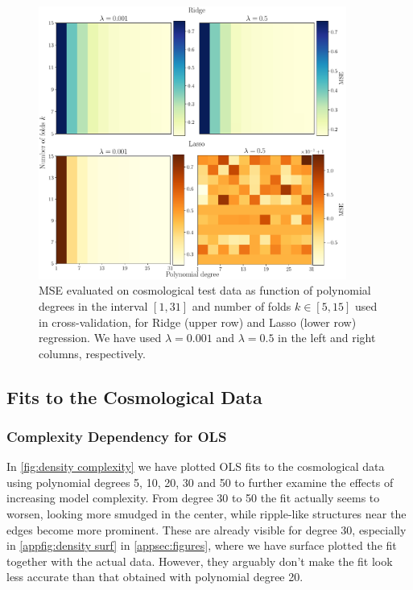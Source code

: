 \documentclass[aps,pra,english,notitlepage,reprint,nofootinbib]{revtex4-1}  %
\begin{document}
\begin{figure}
  \vspace*{-5pt}
  \centering %
  \includegraphics[width=0.9\textwidth]{../figs/g_Ridge_Lasso.pdf}
  \caption{MSE evaluated on cosmological test data as function of polynomial degrees in the interval $[1, 31]$ and number of folds $k\in[5, 15]$ used in cross-validation, for Ridge (upper row) and Lasso (lower row) regression. We have used $\lambda=0.001$ and $\lambda=0.5$ in the left and right columns, respectively.}\label{fig:g Ridge Lasso}
  \vspace*{-5pt}
\end{figure}

\subsection{Fits to the Cosmological Data}
\subsubsection{Complexity Dependency for OLS}
In \cref{fig:density complexity} we have plotted OLS fits to the cosmological data using polynomial degrees 5, 10, 20, 30 and 50 to further examine the effects of increasing model complexity. From degree 30 to 50 the fit actually seems to worsen, looking more smudged in the center, while ripple-like structures near the edges become more prominent. These are already visible for degree 30, especially in \cref{appfig:density surf} in \cref{appsec:figures}, where we have surface plotted the fit together with the actual data. However, they arguably don't make the fit look less accurate than that obtained with polynomial degree 20.
\end{document}

